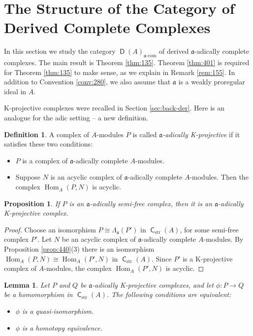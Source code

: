 \documentclass[10pt]{amsart}
\newtheorem{prop}[equation]{Proposition}
\newtheorem{lem}[equation]{Lemma}
\theoremstyle{definition}
\newtheorem{dfn}[equation]{Definition}
\numberwithin{equation}{section}
\newcommand{\opn}{\operatorname}
\newcommand{\cat}[1]{\operatorname{\mathsf{#1}}}
\newcommand{\rmitem}[1]{\item[\textrm{(#1)}]}
\newcommand{\mfrak}[1]{\mathfrak{#1}}
\newcommand{\mrm}[1]{\mathrm{#1}}
\newcommand{\La}{\Lambda}
\renewcommand{\a}{\mfrak{a}}
\newcommand{\tup}[1]{\textrm{#1}}
\begin{document}
\section{The Structure of the Category of Derived Complete Complexes}
\label{sec:struct-cat-dc}

In this section we study the category $\cat{D}(A)_{\tup{$\a$-com}}$
of derived $\a$-adically complete complexes. The main result is
Theorem \ref{thm:135}.
Theorem \ref{thm:401} is required for Theorem \ref{thm:135} to make sense, as
we explain in Remark \ref{rem:155}.
In addition to Convention \ref{conv:280}, we also assume
that $\a$ is a weakly proregular ideal in $A$.

K-projective complexes were recalled in Section \ref{sec:back-der}.
Here is an analogue for the adic setting -- a new definition.

\begin{dfn} \label{dfn:400}
A complex of $A$-modules $P$ is called {\em $\a$-adically
K-projective} if it satisfies these two conditions:
\begin{itemize}
\rmitem{a} $P$ is a complex of $\a$-adically complete $A$-modules.

\rmitem{b} Suppose $N$ is an acyclic complex of $\a$-adically
complete $A$-modules. Then the complex $\opn{Hom}_{A}(P, N)$ is acyclic.
\end{itemize}
\end{dfn}

\begin{prop} \label{prop:400}
If $P$ is an $\a$-adically semi-free complex, then it is an
$\a$-adically K-projective complex.
\end{prop}

\begin{proof}
Choose an isomorphism $P \cong  \La_{\a}(P')$ in $\cat{C}_{\mrm{str}}(A)$, for
some semi-free complex $P'$.
Let $N$ be an acyclic complex of $\a$-adically complete
$A$-modules. By Proposition \ref{prop:440}(3) there is an isomorphism
$\opn{Hom}_{A}(P, N) \cong \opn{Hom}_{A}(P', N)$
in $\cat{C}_{\mrm{str}}(A)$.
Since $P'$ is a K-projective complex of $A$-modules, the complex
$\opn{Hom}_{A}(P', N)$ is acyclic.
\end{proof}

\begin{lem} \label{lem:405}
Let $P$ and $Q$ be $\a$-adically K-projective complexes, and let
$\phi : P \to Q$ be a homomorphism in $\cat{C}_{\mrm{str}}(A)$.
The following conditions are equivalent:
\begin{itemize}
\rmitem{i} $\phi$ is a quasi-isomorphism.

\rmitem{ii} $\phi$ is a homotopy equivalence.
\end{itemize}
\end{lem}
\end{document}
